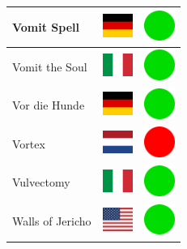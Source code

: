 \documentclass[12pt, a4paper, twoside]{report}
\begin{document}
\begin{center}
\begin{longtable}{|p{5cm}|p{2cm}|p{2cm}|}
 Vomit Spell                                                & \includegraphics[width=1cm]{4x3/de} &   \includegraphics[width=1cm]{likes/y} \\ \hline
 Vomit the Soul                                             & \includegraphics[width=1cm]{4x3/it} &   \includegraphics[width=1cm]{likes/y} \\ \hline
 Vor die Hunde                                              & \includegraphics[width=1cm]{4x3/de} &   \includegraphics[width=1cm]{likes/y} \\ \hline
 Vortex                                                     & \includegraphics[width=1cm]{4x3/nl} &   \includegraphics[width=1cm]{likes/n} \\ \hline
 Vulvectomy                                                 & \includegraphics[width=1cm]{4x3/it} &   \includegraphics[width=1cm]{likes/y} \\ \hline
 Walls of Jericho                                           & \includegraphics[width=1cm]{4x3/us} &   \includegraphics[width=1cm]{likes/y} \\ \hline

\end{longtable}
\end{center}
\end{document}
